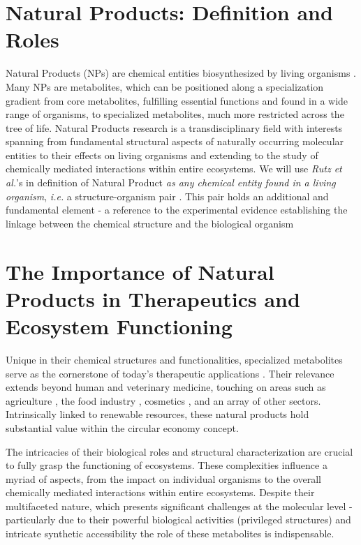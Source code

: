 \documentclass[
11pt, %
oneside, %
english, %
singlespacing, %
headsepline, %
chapterinoneline, %
]{MastersDoctoralThesis} %
\begin{document}
\section{Natural Products: Definition and Roles}\label{sec:NP def and roles}
Natural Products (NPs) are chemical entities biosynthesized by living organisms \cite{AllNatural2007}. Many NPs are metabolites, which can be positioned along a specialization gradient from core metabolites, fulfilling essential functions and found in a wide range of organisms, to specialized metabolites, much more restricted across the tree of life. Natural Products research is a transdisciplinary field with interests spanning from fundamental structural aspects of naturally occurring molecular entities to their effects on living organisms and extending to the study of chemically mediated interactions within entire ecosystems. We will use \textit{Rutz et al.}'s in definition of Natural Product \textit{as any chemical entity found in a living organism}, \textit{i.e.} a structure-organism pair \cite{rutzLOTUSInitiativeOpen2022}. This pair holds an additional and fundamental element - a reference to the experimental evidence establishing the linkage between the chemical structure and the biological organism

\section{The Importance of Natural Products in Therapeutics and Ecosystem Functioning}
Unique in their chemical structures and functionalities, specialized metabolites serve as the cornerstone of today's therapeutic applications \cite{harveyReemergenceNaturalProducts2015}. Their relevance extends beyond human and veterinary medicine, touching on areas such as agriculture \cite{yanImpactProspectNatural2018}, the food industry \cite{gonzalez-manzanoApplicationsNaturalProducts2021}, cosmetics \cite{liuNaturalProductsCosmetics2022}, and an array of other sectors. Intrinsically linked to renewable resources, these natural products hold substantial value within the circular economy concept.

The intricacies of their biological roles and structural characterization are crucial to fully grasp the functioning of ecosystems. These complexities influence a myriad of aspects, from the impact on individual organisms to the overall chemically mediated interactions within entire ecosystems. Despite their multifaceted nature, which presents significant challenges at the molecular level - particularly due to their powerful biological activities (privileged structures) and intricate synthetic accessibility the role of these metabolites is indispensable.
\end{document}
